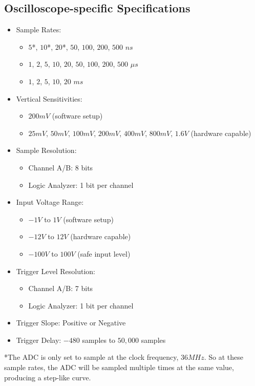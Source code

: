 \subsection{Oscilloscope-specific Specifications}
\begin{itemize}
	\item Sample Rates:
		\begin{itemize}
			\item $5$*, $10$*, $20$*, $50$, $100$, $200$, $500$ $ns$
			\item $1$, $2$, $5$, $10$, $20$, $50$, $100$, $200$, $500$ $\mu s$
			\item $1$, $2$, $5$, $10$, $20$ $ms$
		\end{itemize}
	\item Vertical Sensitivities:
		\begin{itemize}
			\item $200mV$ (software setup)
			\item $25mV$, $50mV$, $100mV$, $200mV$, $400mV$, $800mV$, $1.6V$ (hardware capable)
		\end{itemize}
	\item Sample Resolution:
		\begin{itemize}
			\item Channel A/B: 8 bits
			\item Logic Analyzer: 1 bit per channel
		\end{itemize}
	\item Input Voltage Range:
		\begin{itemize}
			\item $-1V$ to $1V$ (software setup)
			\item $-12V$ to $12V$ (hardware capable)
			\item $-100V$ to $100V$ (safe input level)
		\end{itemize}
	\item Trigger Level Resolution:
		\begin{itemize}
			\item Channel A/B: 7 bits
			\item Logic Analyzer: 1 bit per channel
		\end{itemize}
	\item Trigger Slope: Positive or Negative
	\item Trigger Delay: $-480$ samples to $50,000$ samples
\end{itemize}

*The ADC is only set to sample at the clock frequency, $36MHz$. So at these sample rates, the ADC will be sampled multiple times at the same value, producing a step-like curve.
